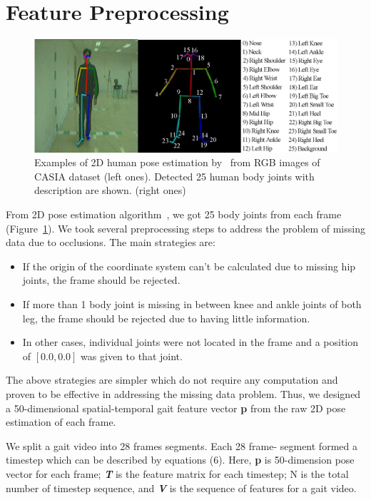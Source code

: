 \section{Feature Preprocessing}
\begin{figure}
	\label{fig:pose_estimation}
	\centering 
	\includegraphics[width = 125mm]{figures/pose_estimation.eps}
	\caption{
		Examples of 2D human pose estimation by~\cite{Cao_19} from RGB images of CASIA dataset (left ones). Detected 25 human body joints with description are shown. (right ones) 
	}
\end{figure}

From 2D pose estimation algorithm~\cite{Cao_19}, we got 25 body joints from each frame (Figure~\ref{fig:pose_estimation}). We took several preprocessing steps to address the problem of missing data due to occlusions. The main strategies are: 
\begin{itemize}
\item If the origin of the coordinate system can't be calculated due to missing hip joints, the frame should be rejected.
\item If more than 1 body joint is missing in between knee and ankle joints of both leg, the frame should be rejected due to having little information.
\item In other cases, individual joints were not located in the frame and a position of $[0.0, 0.0]$  was given to that joint. 
\end{itemize}

The above strategies are simpler which do not require any computation and proven to be effective in addressing the missing data problem. Thus, we designed a 50-dimensional spatial-temporal gait feature vector \textbf{p} from the raw 2D pose estimation of each frame. 

We split a gait video into 28 frames segments. Each 28 frame- segment formed a timestep which can be described by equations (6). Here, \textbf{p} is 50-dimension pose vector for each frame; \textit{\textbf{T}} is the feature matrix for each timestep; N is the total number of timestep sequence, and \textit{\textbf{V}} is the sequence of features for a gait video. 

